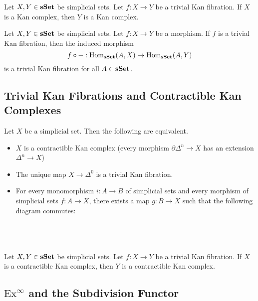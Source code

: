 \documentclass[a4paper]{article}
\begin{document}
\begin{prp}{}{} Let $X,Y\in\bold{sSet}$ be simplicial sets. Let $f:X\to Y$ be a trivial Kan fibration. If $X$ is a Kan complex, then $Y$ is a Kan complex. 
\end{prp}

\begin{prp}{}{} Let $X,Y\in\bold{sSet}$ be simplicial sets. Let $f:X\to Y$ be a morphism. If $f$ is a trivial Kan fibration, then the induced morphism $$f\circ -:\operatorname{Hom}_\bold{sSet}(A,X)\to\operatorname{Hom}_\bold{sSet}(A,Y)$$ is a trivial Kan fibration for all $A\in\bold{sSet}$. 
\end{prp}

\subsection{Trivial Kan Fibrations and Contractible Kan Complexes}
\begin{prp}{}{} Let $X$ be a simplicial set. Then the following are equivalent. 
\begin{itemize}
\item $X$ is a contractible Kan complex (every morphism $\partial\Delta^n\to X$ has an extension $\Delta^n\to X$)
\item The unique map $X\to\Delta^0$ is a trivial Kan fibration. 
\item For every monomorphism $i:A\to B$ of simplicial sets and every morphism of simplicial sets $f:A\to X$, there exists a map $g:B\to X$ such that the following diagram commutes: \\~\\
\\~\\
\end{itemize}
\end{prp}

\begin{prp}{}{} Let $X,Y\in\bold{sSet}$ be simplicial sets. Let $f:X\to Y$ be a trivial Kan fibration. If $X$ is a contractible Kan complex, then $Y$ is a contractible Kan complex. 
\end{prp}

\subsection{$\text{Ex}^\infty$ and the Subdivision Functor}
\end{document}
